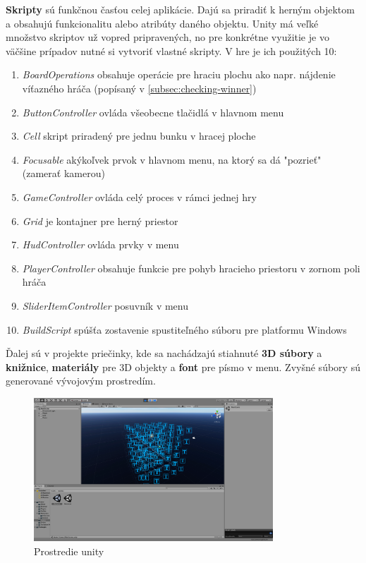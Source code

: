 \textbf{Skripty} sú funkčnou časťou celej aplikácie.
Dajú sa priradiť k herným objektom a obsahujú funkcionalitu alebo atribúty daného objektu.
Unity má veľké množstvo skriptov už vopred pripravených, no pre konkrétne využitie je vo väčšine prípadov nutné si
vytvoriť vlastné skripty.
V hre je ich použitých 10:
\begin{enumerate}
    \item \emph{BoardOperations} obsahuje operácie pre hraciu plochu ako napr. nájdenie víťazného hráča (popísaný
    v \autoref{subsec:checking-winner})
    \item \emph{ButtonController} ovláda všeobecne tlačidlá v hlavnom menu
    \item \emph{Cell} skript priradený pre jednu bunku v hracej ploche
    \item \emph{Focusable} akýkoľvek prvok v hlavnom menu, na ktorý sa dá "pozrieť" (zamerať kamerou)
    \item \emph{GameController} ovláda celý proces v rámci jednej hry
    \item \emph{Grid} je kontajner pre herný priestor
    \item \emph{HudController} ovláda prvky v menu
    \item \emph{PlayerController} obsahuje funkcie pre pohyb hracieho priestoru v zornom poli hráča
    \item \emph{SliderItemController} posuvník v menu
    \item \emph{BuildScript} spúšťa zostavenie spustiteľného súboru pre platformu Windows
\end{enumerate}

Ďalej sú v projekte priečinky, kde sa nachádzajú stiahnuté \textbf{3D súbory} a \textbf{knižnice}, \textbf{materiály}
pre 3D objekty a \textbf{font} pre písmo v menu.
Zvyšné súbory sú generované vývojovým prostredím.

\begin{figure}[H]
    \centering
    \includegraphics[width=0.8\textwidth]{images/unity.png}
    \caption{Prostredie unity}
\end{figure}\label{figure:unity}

